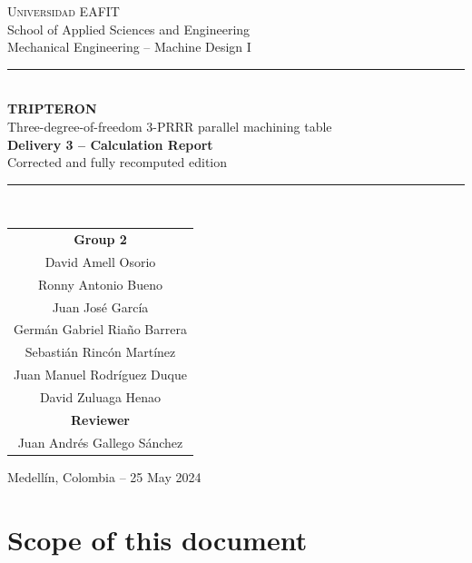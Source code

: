 \documentclass[11pt]{article}
\def\calculo{ }
\def\nombre{Group 2}
\begin{document}
\thispagestyle{empty}
\begin{center}
\vspace*{1.2cm}
{\Large\scshape Universidad EAFIT}\\[2pt]
{\large School of Applied Sciences and Engineering}\\[2pt]
{\large Mechanical Engineering -- Machine Design I}\\[1.6cm]

\rule{\textwidth}{1.2pt}\\[10pt]
{\huge\bfseries TRIPTERON}\\[8pt]
{\LARGE Three-degree-of-freedom 3-PRRR parallel machining table}\\[10pt]
{\Large\bfseries Delivery 3 -- Calculation Report}\\[6pt]
{\large Corrected and fully recomputed edition}\\[8pt]
\rule{\textwidth}{1.2pt}\\[1.8cm]

\begin{tabular}{c}
{\large\bfseries Group 2}\\[8pt]
{\large David Amell Osorio}\\[3pt]
{\large Ronny Antonio Bueno}\\[3pt]
{\large Juan Jos\'e Garc\'ia}\\[3pt]
{\large Germ\'an Gabriel Ria\~no Barrera}\\[3pt]
{\large Sebasti\'an Rinc\'on Mart\'inez}\\[3pt]
{\large Juan Manuel Rodr\'iguez Duque}\\[3pt]
{\large David Zuluaga Henao}\\[1.0cm]
{\large\bfseries Reviewer}\\[6pt]
{\large Juan Andr\'es Gallego S\'anchez}\\[1.2cm]
\end{tabular}

\vfill
{\large Medell\'in, Colombia -- 25 May 2024}
\end{center}

\clearpage
\setcounter{page}{1}
\def\calculo{Contents and scope}
\def\nombre{Group 2}

\section{Scope of this document}\label{sec:scope}
\end{document}
